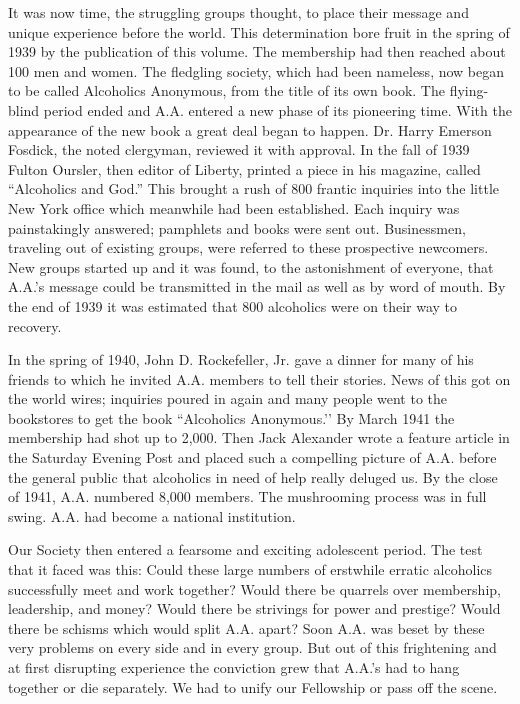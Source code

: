 \begin{biblechapter}
\verse It was now time, the struggling groups thought, 
    to place their message and unique experience before the world. 
\verse This determination bore fruit in the spring of 1939 by the publication of this volume. 
\verse The membership had then reached about 100 men and women. 
\verse The fledgling society, which had been nameless, now began to be called Alcoholics Anonymous, 
    from the title of its own book. 
\verse The flying-blind period ended and A.A. entered a new phase of its pioneering time.
\verse With the appearance of the new book a great deal began to happen. 
\verse Dr. Harry Emerson Fosdick, the noted clergyman, reviewed it with approval. 
\verse In the fall of 1939 Fulton Oursler, then editor of Liberty, printed a piece in his magazine, called “Alcoholics and God.” 
\verse This brought a rush of 800 frantic inquiries into the little New York office which meanwhile had been established. 
\verse Each inquiry was painstakingly answered; 
    pamphlets and books were sent out. 
\verse Businessmen, traveling out of existing groups, were referred to these prospective newcomers. 
\verse New groups started up and it was found, to the astonishment of everyone, 
    that A.A.’s message could be transmitted in the mail as well as by word of mouth. 
\verse By the end of 1939 it was estimated that 800 alcoholics were on their way to recovery.

\verse In the spring of 1940, John D. Rockefeller, Jr. gave a dinner for many of his friends 
    to which he invited A.A. members to tell their stories. 
\verse News of this got on the world wires; 
    inquiries poured in again and many people went to the bookstores to get the book “Alcoholics Anonymous.’’ 
\verse By March 1941 the membership had shot up to 2,000. 
\verse Then Jack Alexander wrote a feature article in the Saturday Evening Post 
    and placed such a compelling picture of A.A. before the general public 
    that alcoholics in need of help really deluged us. 
\verse By the close of 1941, A.A. numbered 8,000 members. 
\verse The mushrooming process was in full swing.
\verse A.A. had become a national institution.

\verse Our Society then entered a fearsome and exciting adolescent period. 
\verse The test that it faced was this:
    Could these large numbers of erstwhile erratic alcoholics successfully meet and work together? 
    Would there be quarrels over membership, leadership, and money? 
    Would there be strivings for power and prestige? 
    Would there be schisms which would split A.A. apart? 
\verse Soon A.A. was beset by these very problems on every side and in every group. 
\verse But out of this frightening and at first disrupting experience 
    the conviction grew that A.A.’s had to hang together or die separately. 
\verse We had to unify our Fellowship or pass off the scene.


\end{biblechapter}
